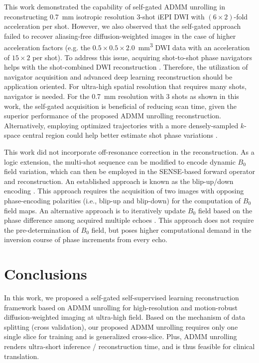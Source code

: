 \documentclass[AMA,STIX2COL,Linenumberson]{MRM}
\begin{document}
This work demonstrated the capability of self-gated ADMM unrolling in
reconstructing \SI{0.7}{mm} isotropic resolution 3-shot iEPI DWI
with $(6 \times 2)$-fold acceleration per shot.
However, we also observed that the self-gated approach
failed to recover aliasing-free diffusion-weighted images
in the case of higher acceleration factors
(e.g. the $0.5\times0.5\times2.0$~\si{mm^3} DWI data
with an acceleration of $15\times2$ per shot).
To address this issue, acquiring shot-to-shot phase navigators
helps with the shot-combined DWI reconstruction \cite{tan_2024_naviepi}.
Therefore, the utilization of navigator acquisition and
advanced deep learning reconstruction should be application oriented.
For ultra-high spatial resolution that requires many shots,
navigator is needed.
For the 0.7~mm resolution with 3 shots as shown in this work,
the self-gated acquisition is beneficial of reducing scan time,
given the superior performance of the proposed ADMM unrolling reconstruction.
Alternatively, employing optimized trajectories
with a more densely-sampled $k$-space central region
could help better estimate shot phase variations
\cite{liu_2004_diff_spiral,dai_2023_epti-diff}.

This work did not incorporate off-resonance correction in the reconstruction.
As a logic extension, the multi-shot sequence can be modified
to encode dynamic $B_0$ field variation, which can then be employed in the SENSE-based forward operator and reconstruction. An established approach
is known as the blip-up/down encoding \cite{zahneisen_2017_blipud}.
This approach requires the acquisition of two images
with opposing phase-encoding polarities (i.e., blip-up and blip-down)
for the computation of $B_0$ field maps.
An alternative approach is to iteratively update $B_0$ field
based on the phase difference among acquired multiple echoes \cite{tan_2023_meco}.
This approach does not require the pre-determination of $B_0$ field,
but poses higher computational demand in the inversion course of phase increments
from every echo.

\section{Conclusions}\label{SEC:CONCL}

In this work, we proposed a self-gated self-supervised learning
reconstruction framework based on ADMM unrolling
for high-resolution and motion-robust diffusion-weighted imaging
at ultra-high field.
Based on the mechanism of data splitting (cross validation),
our proposed ADMM unrolling requires only one single slice for training
and is generalized cross-slice.
Plus, ADMM unrolling renders ultra-short inference / reconstruction time,
and is thus feasible for clinical translation.
\end{document}
